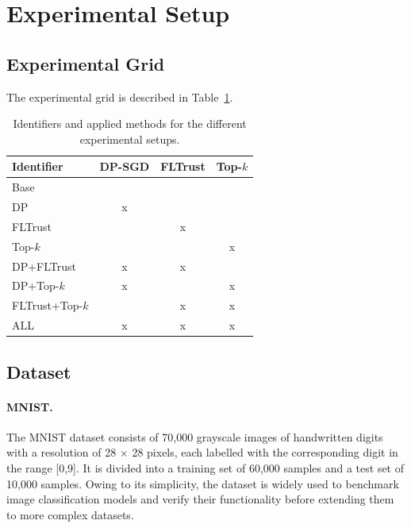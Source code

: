 \documentclass[11pt,twocolumn,a4paper,DIV=calc,parskip=half]{scrartcl}
\begin{document}
	
	\section{Experimental Setup}
	\label{sec:setup}
	
	\subsection{Experimental Grid}
	The experimental grid is described in Table~\ref{table:grid}.
	
	\begin{table}[h]
		\centering
		\begin{tabular}{llll}
			\hline
			\rowcolor[HTML]{C0C0C0} 
			\textbf{Identifier} & \ac{DP-SGD} & FLTrust & Top-$k$ \\ \hline
			Base &  &  &  \\ \hline
			\rowcolor[HTML]{EFEFEF} 
			DP & \multicolumn{1}{c}{\cellcolor[HTML]{EFEFEF}x} &  &  \\ \hline
			FLTrust &  & \multicolumn{1}{c}{x} &  \\ \hline
			\rowcolor[HTML]{EFEFEF} 
			Top-$k$ &  &  & \multicolumn{1}{c}{\cellcolor[HTML]{EFEFEF}x} \\ \hline
			DP+FLTrust & \multicolumn{1}{c}{x} & \multicolumn{1}{c}{x} &  \\ \hline
			\rowcolor[HTML]{EFEFEF} 
			DP+Top-$k$ & \multicolumn{1}{c}{\cellcolor[HTML]{EFEFEF}x} &  & \multicolumn{1}{c}{\cellcolor[HTML]{EFEFEF}x} \\ \hline
			FLTrust+Top-$k$ &  & \multicolumn{1}{c}{x} & \multicolumn{1}{c}{x} \\ \hline
			\rowcolor[HTML]{EFEFEF} 
			ALL & \multicolumn{1}{c}{\cellcolor[HTML]{EFEFEF}x} & \multicolumn{1}{c}{\cellcolor[HTML]{EFEFEF}x} & \multicolumn{1}{c}{\cellcolor[HTML]{EFEFEF}x} \\ \hline
		\end{tabular}
		\caption{Identifiers and applied methods for the different experimental setups.}
		\label{table:grid}
	\end{table}
	

	\subsection{Dataset}

	\paragraph{MNIST.} The MNIST dataset consists of 70,000 grayscale images of handwritten digits with a resolution of 28 × 28 pixels, each labelled with the corresponding digit in the range [0,9]. It is divided into a training set of 60,000 samples and a test set of 10,000 samples. Owing to its simplicity, the dataset is widely used to benchmark image classification models and verify their functionality before extending them to more complex datasets.
	
\end{document}
